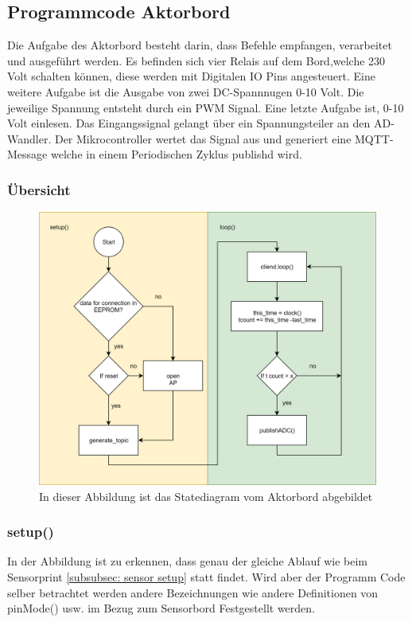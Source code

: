 \subsection{Programmcode Aktorbord}
Die Aufgabe des Aktorbord besteht darin, dass Befehle empfangen, verarbeitet und ausgeführt werden. Es befinden sich vier Relais auf dem Bord,welche 230 Volt schalten können, diese werden mit Digitalen IO Pins angesteuert. Eine weitere Aufgabe ist die Ausgabe von zwei DC-Spannnugen 0-10 Volt. Die jeweilige Spannung entsteht durch ein PWM Signal. Eine letzte Aufgabe ist, 0-10 Volt einlesen. Das Eingangssignal gelangt über ein Spannungsteiler an den AD-Wandler. Der Mikrocontroller wertet das Signal aus und generiert eine MQTT-Message welche in einem Periodischen Zyklus publishd wird.    


\subsubsection{	Übersicht} 
\begin{figure}[H]
	\centering
	\includegraphics[width=\textwidth]{graphics/StatemaschineAktor.png}
	\caption{In dieser Abbildung ist das Statediagram vom Aktorbord abgebildet}
	\label{pic: statemaschine Aktor}
\end{figure} 
\newpage

\subsubsection{setup()}
In der Abbildung ist zu erkennen, dass genau der gleiche Ablauf wie beim Sensorprint \ref{subsubsec: sensor setup} statt findet. Wird aber der Programm Code selber betrachtet werden andere Bezeichnungen wie andere Definitionen von pinMode() usw. im Bezug zum Sensorbord Festgestellt werden. 
